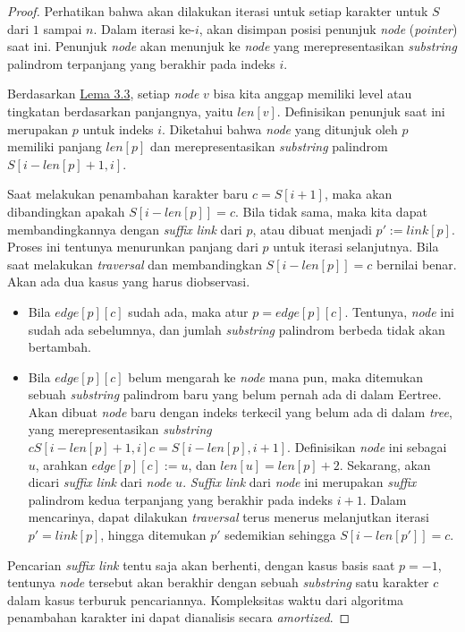 \documentclass[11pt, a4paper, final]{article}
\begin{document}
\begin{proof}
Perhatikan bahwa akan dilakukan iterasi untuk setiap karakter untuk $S$ dari $1$ sampai $n$. Dalam iterasi ke-$i$, akan disimpan posisi penunjuk \textit{node} (\textit{pointer}) saat ini. Penunjuk \textit{node} akan menunjuk ke \textit{node} yang merepresentasikan \textit{substring} palindrom terpanjang yang berakhir pada indeks $i$.

Berdasarkan \hyperref[levelNode]{Lema 3.3}, setiap \textit{node} $v$ bisa kita anggap memiliki level atau tingkatan berdasarkan panjangnya, yaitu $len[v]$. Definisikan penunjuk saat ini merupakan $p$ untuk indeks $i$. Diketahui bahwa \textit{node} yang ditunjuk oleh $p$ memiliki panjang $len[p]$ dan merepresentasikan \textit{substring} palindrom $S[i - len[p] + 1, i]$.

Saat melakukan penambahan karakter baru $c = S[i + 1]$, maka akan dibandingkan apakah $S[i - len[p]] = c$. Bila tidak sama, maka kita dapat membandingkannya dengan \textit{suffix link} dari $p$, atau dibuat menjadi $p' := link[p]$. Proses ini tentunya menurunkan panjang dari $p$ untuk iterasi selanjutnya. Bila saat melakukan \textit{traversal} dan membandingkan $S[i - len[p]] = c$ bernilai benar. Akan ada dua kasus yang harus diobservasi.

\begin{itemize}
    \item Bila $edge[p][c]$ sudah ada, maka atur $p = edge[p][c]$. Tentunya, \textit{node} ini sudah ada sebelumnya, dan jumlah \textit{substring} palindrom berbeda tidak akan bertambah.
    \item Bila $edge[p][c]$ belum mengarah ke \textit{node} mana pun, maka ditemukan sebuah \textit{substring} palindrom baru yang belum pernah ada di dalam Eertree. Akan dibuat \textit{node} baru dengan indeks terkecil yang belum ada di dalam \textit{tree}, yang merepresentasikan \textit{substring} $cS[i - len[p] + 1, i]c = S[i - len[p], i + 1]$. Definisikan \textit{node} ini sebagai $u$, arahkan $edge[p][c] := u$, dan $len[u] = len[p] + 2$. Sekarang, akan dicari \textit{suffix link} dari \textit{node} $u$. \textit{Suffix link} dari \textit{node} ini merupakan \textit{suffix} palindrom kedua terpanjang yang berakhir pada indeks $i + 1$. Dalam mencarinya, dapat dilakukan \textit{traversal} terus menerus melanjutkan iterasi $p' = link[p]$, hingga ditemukan $p'$ sedemikian sehingga $S[i - len[p']] = c$.
\end{itemize}

Pencarian \textit{suffix link} tentu saja akan berhenti, dengan kasus basis saat $p = -1$, tentunya \textit{node} tersebut akan berakhir dengan sebuah \textit{substring} satu karakter $c$ dalam kasus terburuk pencariannya. Kompleksitas waktu dari algoritma penambahan karakter ini dapat dianalisis secara \textit{amortized}.


\end{proof}
\end{document}

